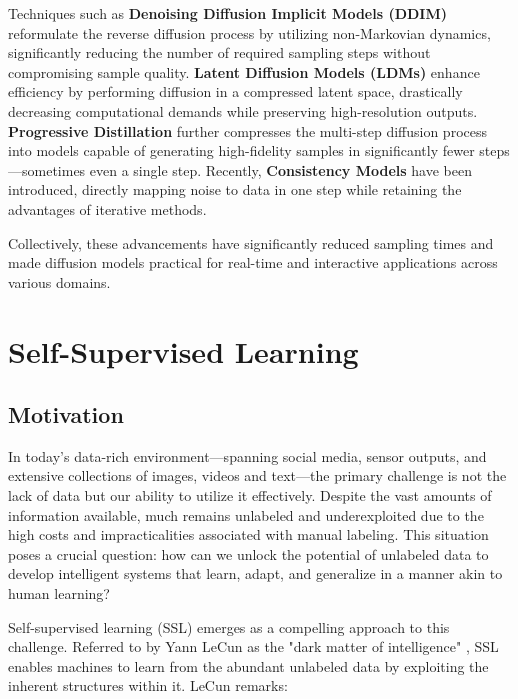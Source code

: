 Techniques such as \textbf{Denoising Diffusion Implicit Models (DDIM)} \cite{song2020denoising} reformulate the reverse diffusion process by utilizing non-Markovian dynamics, significantly reducing the number of required sampling steps without compromising sample quality. \textbf{Latent Diffusion Models (LDMs)} \cite{rombach2022high} enhance efficiency by performing diffusion in a compressed latent space, drastically decreasing computational demands while preserving high-resolution outputs. \textbf{Progressive Distillation} \cite{salimans2022progressive} further compresses the multi-step diffusion process into models capable of generating high-fidelity samples in significantly fewer steps—sometimes even a single step. Recently, \textbf{Consistency Models} \cite{song2023consistency} have been introduced, directly mapping noise to data in one step while retaining the advantages of iterative methods.

Collectively, these advancements have significantly reduced sampling times and made diffusion models practical for real-time and interactive applications across various domains.

\section{Self-Supervised Learning}\label{intro:ssl}

\subsection{Motivation}


In today's data-rich environment—spanning social media, sensor outputs, and extensive collections of images, videos and text—the primary challenge is not the lack of data but our ability to utilize it effectively. Despite the vast amounts of information available, much remains unlabeled and underexploited due to the high costs and impracticalities associated with manual labeling. This situation poses a crucial question: how can we unlock the potential of unlabeled data to develop intelligent systems that learn, adapt, and generalize in a manner akin to human learning?

Self-supervised learning (SSL) emerges as a compelling approach to this challenge. Referred to by Yann LeCun as the "dark matter of intelligence" \citep{lecun2021self}, SSL enables machines to learn from the abundant unlabeled data by exploiting the inherent structures within it. LeCun remarks:

